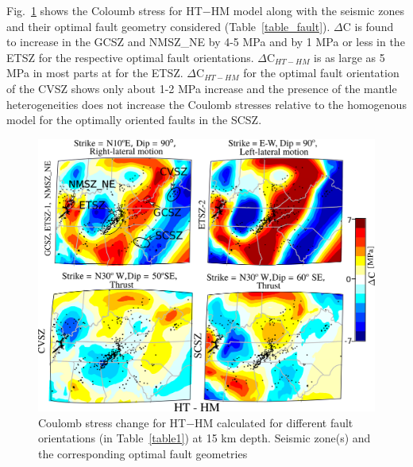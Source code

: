 \documentclass[draft,linenumbers]{agujournal2018}
\begin{document}
 Fig.~\ref{ht_hm_cs} shows the Coloumb stress for HT$-$HM model along with the seismic zones and their optimal fault geometry considered (Table~\ref{table_fault}). 
$\Delta$C is found to increase in the GCSZ and NMSZ\_NE by 4-5 MPa and by 1 MPa or less in the ETSZ for the respective optimal fault orientations. $\Delta$C$_{HT-HM}$ is as large as 5 MPa in most parts at  for the ETSZ. $\Delta$C$_{HT-HM}$ for the optimal fault orientation of the CVSZ shows only about 1-2 MPa increase and the presence of the mantle heterogeneities does not increase the Coulomb stresses relative to the homogenous model for the optimally oriented faults in the SCSZ. %
%
\begin{figure}[h!]
    \centering
    \includegraphics[width=0.75\linewidth]{figures/cs_ht_hm.png}
    \caption{Coulomb stress change for HT$-$HM calculated for different fault orientations (in Table~\ref{table1}) at 15 km depth. Seismic zone(s) and the corresponding optimal fault geometries }
    \label{ht_hm_cs}
\end{figure}
\end{document}
